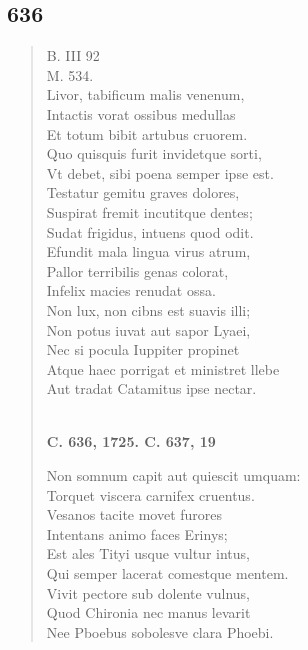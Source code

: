 \documentclass[11pt, a4paper]{report}
\begin{document}
            \subsection*{636}
      \begin{verse}
      B. III 92 \\ M. 534. \\ Livor, tabificum malis venenum, \\ Intactis vorat ossibus medullas \\ Et totum bibit artubus cruorem. \\ Quo quisquis furit invidetque sorti, \\ Vt debet, sibi poena semper ipse est. \\ Testatur gemitu graves dolores, \\ Suspirat fremit incutitque dentes; \\ Sudat frigidus, intuens quod odit. \\ Efundit mala lingua virus atrum, \\ Pallor terribilis genas colorat, \\ Infelix macies renudat ossa. \\ Non lux, non cibns est suavis illi; \\ Non potus iuvat aut sapor Lyaei, \\ Nec si pocula Iuppiter propinet \\ Atque haec porrigat et ministret llebe \\ Aut tradat Catamitus ipse nectar. \\ 
        ﻿\pagebreak 
    \begin{center} \textbf{C. 636, 1725. C. 637, 19} \end{center} \marginpar{[103]} Non somnum capit aut quiescit umquam: \\ Torquet viscera carnifex cruentus. \\ Vesanos tacite movet furores \\ Intentans animo faces Erinys; \\ Est ales Tityi usque vultur intus, \\ Qui semper lacerat comestque mentem. \\ Vivit pectore sub dolente vulnus, \\ Quod Chironia nec manus levarit \\ Nee Pboebus sobolesve clara Phoebi. \\ 
      \end{verse}
  
\end{document}

